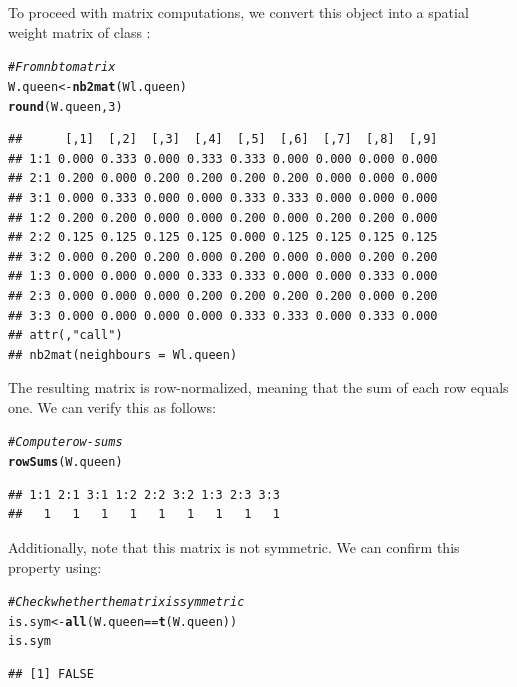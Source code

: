 \documentclass[english,12pt]{book}\usepackage[]{graphicx}\usepackage[]{xcolor}
\makeatletter
\newcommand{\hlnum}[1]{\textcolor[rgb]{0.686,0.059,0.569}{#1}}%
\newcommand{\hlcom}[1]{\textcolor[rgb]{0.678,0.584,0.686}{\textit{#1}}}%
\newcommand{\hlopt}[1]{\textcolor[rgb]{0,0,0}{#1}}%
\newcommand{\hldef}[1]{\textcolor[rgb]{0.345,0.345,0.345}{#1}}%
\newcommand{\hlkwb}[1]{\textcolor[rgb]{0.69,0.353,0.396}{#1}}%
\newcommand{\hlkwd}[1]{\textcolor[rgb]{0.737,0.353,0.396}{\textbf{#1}}}%
\newenvironment{kframe}{%
 \def\at@end@of@kframe{}%
 \ifinner\ifhmode%
  \def\at@end@of@kframe{\end{minipage}}%
  \begin{minipage}{\columnwidth}%
 \fi\fi%
 \def\FrameCommand##1{\hskip\@totalleftmargin \hskip-\fboxsep
 \colorbox{shadecolor}{##1}\hskip-\fboxsep
     \hskip-\linewidth \hskip-\@totalleftmargin \hskip\columnwidth}%
 \MakeFramed {\advance\hsize-\width
   \@totalleftmargin\z@ \linewidth\hsize
   \@setminipage}}%
 {\par\unskip\endMakeFramed%
 \at@end@of@kframe}
\newenvironment{knitrout}{}{} %
\makeatother
\begin{document}
To proceed with matrix computations, we convert this  object into a spatial weight matrix of class :
\begin{knitrout}
\color{fgcolor}\begin{kframe}
\begin{alltt}
\hlcom{# From nb to matrix}
\hldef{W.queen} \hlkwb{<-} \hlkwd{nb2mat}\hldef{(Wl.queen)}
\hlkwd{round}\hldef{(W.queen,} \hlnum{3}\hldef{)}
\end{alltt}
\begin{verbatim}
##      [,1]  [,2]  [,3]  [,4]  [,5]  [,6]  [,7]  [,8]  [,9]
## 1:1 0.000 0.333 0.000 0.333 0.333 0.000 0.000 0.000 0.000
## 2:1 0.200 0.000 0.200 0.200 0.200 0.200 0.000 0.000 0.000
## 3:1 0.000 0.333 0.000 0.000 0.333 0.333 0.000 0.000 0.000
## 1:2 0.200 0.200 0.000 0.000 0.200 0.000 0.200 0.200 0.000
## 2:2 0.125 0.125 0.125 0.125 0.000 0.125 0.125 0.125 0.125
## 3:2 0.000 0.200 0.200 0.000 0.200 0.000 0.000 0.200 0.200
## 1:3 0.000 0.000 0.000 0.333 0.333 0.000 0.000 0.333 0.000
## 2:3 0.000 0.000 0.000 0.200 0.200 0.200 0.200 0.000 0.200
## 3:3 0.000 0.000 0.000 0.000 0.333 0.333 0.000 0.333 0.000
## attr(,"call")
## nb2mat(neighbours = Wl.queen)
\end{verbatim}
\end{kframe}
\end{knitrout}

The resulting matrix is row-normalized, meaning that the sum of each row equals one. We can verify this as follows:
\begin{knitrout}
\color{fgcolor}\begin{kframe}
\begin{alltt}
\hlcom{# Compute row-sums}
\hlkwd{rowSums}\hldef{(W.queen)}
\end{alltt}
\begin{verbatim}
## 1:1 2:1 3:1 1:2 2:2 3:2 1:3 2:3 3:3 
##   1   1   1   1   1   1   1   1   1
\end{verbatim}
\end{kframe}
\end{knitrout}

Additionally, note that this matrix is not symmetric. We can confirm this property using:
\begin{knitrout}
\color{fgcolor}\begin{kframe}
\begin{alltt}
\hlcom{# Check whether the matrix is symmetric}
\hldef{is.sym} \hlkwb{<-} \hlkwd{all}\hldef{(W.queen} \hlopt{==} \hlkwd{t}\hldef{(W.queen))}
\hldef{is.sym}
\end{alltt}
\begin{verbatim}
## [1] FALSE
\end{verbatim}
\end{kframe}
\end{knitrout}
\end{document}
